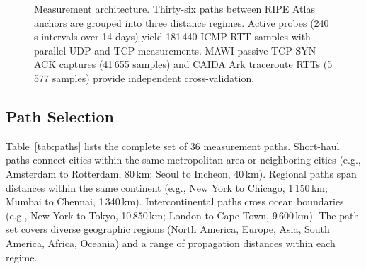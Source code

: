 \documentclass[conference]{IEEEtran}
\begin{document}
\begin{figure}[t]
\caption{Measurement architecture. Thirty-six paths between RIPE Atlas
anchors are grouped into three distance regimes. Active probes
(240\,s intervals over 14 days) yield 181\,440 ICMP RTT samples with
parallel UDP and TCP measurements.
MAWI passive TCP SYN-ACK captures (41\,655 samples) and CAIDA Ark
traceroute RTTs (5\,577 samples) provide independent cross-validation.}
\label{fig:architecture}
\end{figure}

\subsection{Path Selection}

Table~\ref{tab:paths} lists the complete set of 36 measurement paths. Short-haul paths connect cities within the same metropolitan area or neighboring cities (e.g., Amsterdam to Rotterdam, 80\,km; Seoul to Incheon, 40\,km). Regional paths span distances within the same continent (e.g., New York to Chicago, 1\,150\,km; Mumbai to Chennai, 1\,340\,km). Intercontinental paths cross ocean boundaries (e.g., New York to Tokyo, 10\,850\,km; London to Cape Town, 9\,600\,km). The path set covers diverse geographic regions (North America, Europe, Asia, South America, Africa, Oceania) and a range of propagation distances within each regime.
\end{document}
